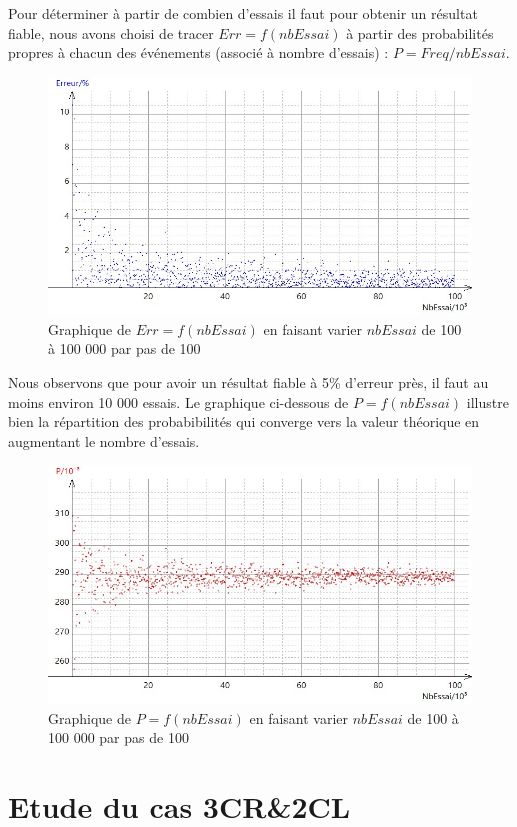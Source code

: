 \documentclass{report}
\begin{document}
\begin{enumerate}
Pour déterminer à partir de combien d'essais il faut pour obtenir un résultat fiable, nous avons choisi de tracer $Err=f(nbEssai)$ à partir des probabilités propres à chacun des événements (associé à nombre d'essais) : $P = Freq/nbEssai$.
\begin{figure}[H]
	\includegraphics[width=\textwidth]{../graphe/Erreur(n).jpg}
	\caption{Graphique de $Err=f(nbEssai)$ en faisant varier $nbEssai$ de 100 à 100 000 par pas de 100}
\end{figure}	
Nous observons que pour avoir un résultat fiable à 5\% d'erreur près, il faut au moins environ 10 000 essais. Le graphique ci-dessous de $P=f(nbEssai)$ illustre bien la répartition des probabibilités qui converge vers la valeur théorique en augmentant le nombre d'essais. 
\begin{figure}[H]
	\includegraphics[width=\textwidth]{../graphe/P(n).jpg}
	\caption{Graphique de $P=f(nbEssai)$ en faisant varier $nbEssai$ de 100 à 100 000 par pas de 100}
\end{figure}	

\section{Etude du cas 3CR\&2CL}


\end{enumerate}
\end{document}
